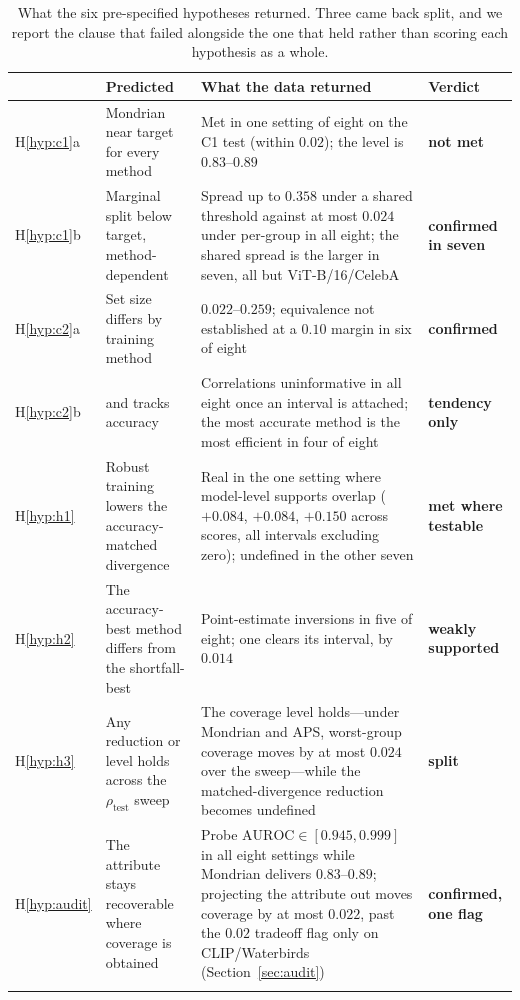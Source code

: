 \documentclass[pdflatex,sn-basic]{sn-jnl}%
\theoremstyle{thmstyleone}%
\newcommand{\auroc}{\mathrm{AUROC}}
\newcommand{\rhotest}{\rho_{\mathrm{test}}}
\begin{document}
\begin{appendices}
\begin{table}[!ht]
\caption{What the six pre-specified hypotheses returned. Three came back split, and we report the
clause that failed alongside the one that held rather than scoring each hypothesis as a whole.}
\label{tab:hypverdict}
\footnotesize
\setlength{\tabcolsep}{4pt}
\begin{tabular}{@{}l>{\raggedright\arraybackslash}p{3.1cm}>{\raggedright\arraybackslash}p{5.3cm}l@{}}
\toprule
& Predicted & What the data returned & Verdict \\
\midrule
H\ref{hyp:c1}a & Mondrian near target for every method
& Met in one setting of eight on the C1 test (within $0.02$); the level is $0.83$--$0.89$
& \textbf{not met} \\
\addlinespace
H\ref{hyp:c1}b & Marginal split below target, method-dependent
& Spread up to $0.358$ under a shared threshold against at most $0.024$ under per-group in all
eight; the shared spread is the larger in seven, all but ViT-B/16/CelebA & \textbf{confirmed in seven} \\
\addlinespace
H\ref{hyp:c2}a & Set size differs by training method
& $0.022$--$0.259$; equivalence not established at a $0.10$ margin in six of eight
& \textbf{confirmed} \\
\addlinespace
H\ref{hyp:c2}b & and tracks accuracy
& Correlations uninformative in all eight once an interval is attached; the most accurate
method is the most efficient in four of eight & \textbf{tendency only} \\
\addlinespace
H\ref{hyp:h1} & Robust training lowers the accuracy-matched divergence
& Real in the one setting where model-level supports overlap ($+0.084$, $+0.084$, $+0.150$ across
scores, all intervals excluding zero); undefined in the other seven
& \textbf{met where testable} \\
\addlinespace
H\ref{hyp:h2} & The accuracy-best method differs from the shortfall-best
& Point-estimate inversions in five of eight; one clears its interval, by $0.014$
& \textbf{weakly supported} \\
\addlinespace
H\ref{hyp:h3} & Any reduction or level holds across the $\rhotest$ sweep
& The coverage level holds---under Mondrian and APS, worst-group coverage moves by at most $0.024$ over the sweep---while
the matched-divergence reduction becomes undefined & \textbf{split} \\
\addlinespace
H\ref{hyp:audit} & The attribute stays recoverable where coverage is obtained
& Probe $\auroc\in[0.945,0.999]$ in all eight settings while Mondrian delivers $0.83$--$0.89$;
projecting the attribute out moves coverage by at most $0.022$, past the $0.02$ tradeoff flag only on
CLIP/Waterbirds (Section~\ref{sec:audit}) & \textbf{confirmed, one flag} \\
\botrule
\end{tabular}
\end{table}




\end{appendices}
\end{document}
